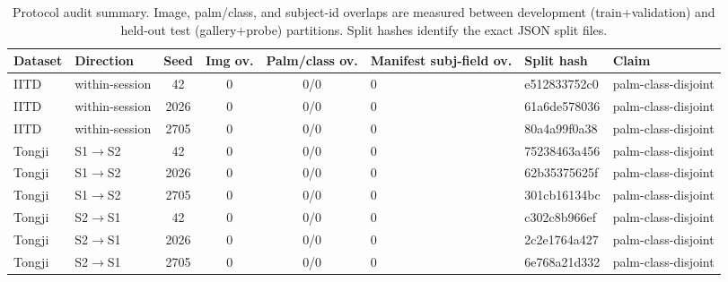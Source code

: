 \begin{table}[t]
\centering
\caption{Protocol audit summary. Image, palm/class, and subject-id overlaps are measured between development (train+validation) and held-out test (gallery+probe) partitions. Split hashes identify the exact JSON split files.}
\label{tab:protocol_audit}
\footnotesize
\setlength{\tabcolsep}{3pt}
\begin{tabular}{llccclll}
\toprule
Dataset & Direction & Seed & Img ov. & Palm/class ov. & Manifest subj-field ov. & Split hash & Claim \\
\midrule
IITD & within-session & 42 & 0 & 0/0 & 0 & e512833752c0 & palm-class-disjoint \\
IITD & within-session & 2026 & 0 & 0/0 & 0 & 61a6de578036 & palm-class-disjoint \\
IITD & within-session & 2705 & 0 & 0/0 & 0 & 80a4a99f0a38 & palm-class-disjoint \\
Tongji & S1$\rightarrow$S2 & 42 & 0 & 0/0 & 0 & 75238463a456 & palm-class-disjoint \\
Tongji & S1$\rightarrow$S2 & 2026 & 0 & 0/0 & 0 & 62b35375625f & palm-class-disjoint \\
Tongji & S1$\rightarrow$S2 & 2705 & 0 & 0/0 & 0 & 301cb16134bc & palm-class-disjoint \\
Tongji & S2$\rightarrow$S1 & 42 & 0 & 0/0 & 0 & c302c8b966ef & palm-class-disjoint \\
Tongji & S2$\rightarrow$S1 & 2026 & 0 & 0/0 & 0 & 2c2e1764a427 & palm-class-disjoint \\
Tongji & S2$\rightarrow$S1 & 2705 & 0 & 0/0 & 0 & 6e768a21d332 & palm-class-disjoint \\
\bottomrule
\end{tabular}
\end{table}
